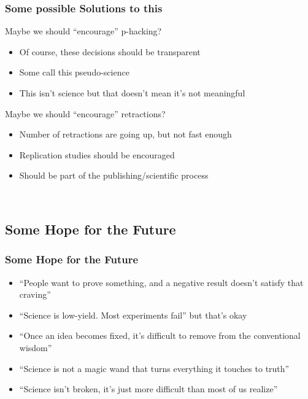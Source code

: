 \documentclass{beamer} %
\newcommand{\1}{\mathbb{1}}
\begin{document}
\begin{frame}[t]\frametitle{Some possible Solutions to this}

Maybe we should ``encourage'' p-hacking?
\begin{itemize}
	\item Of course, these decisions should be transparent
	\item Some call this pseudo-science
	\item This isn't science but that doesn't mean it's not meaningful 
\end{itemize}
\vspace{3mm}
\pause
Maybe we should ``encourage'' retractions?
\begin{itemize}
	\item Number of retractions are going up, but not fast enough
	\item Replication studies should be encouraged
	\item Should be part of the publishing/scientific process
\end{itemize}

\href{http://fivethirtyeight.com/features/science-isnt-broken/}
{}\\	
\end{frame}



\subsection{Some Hope for the Future}

\begin{frame}[t]\frametitle{Some Hope for the Future}

\begin{itemize}
	\item ``People want to prove something, and a negative result doesn’t satisfy that craving'' \pause
	\item ``Science is low-yield. Most experiments fail'' but that's okay \pause
	\item ``Once an idea becomes fixed, it’s difficult to remove from the conventional wisdom'' \pause
	\item ``Science is not a magic wand that turns everything it touches to truth'' \pause
	\item ``Science isn’t broken, it’s just more difficult than most of us realize'' \pause
\end{itemize}

\vspace{3mm}

\end{frame}
\end{document}
